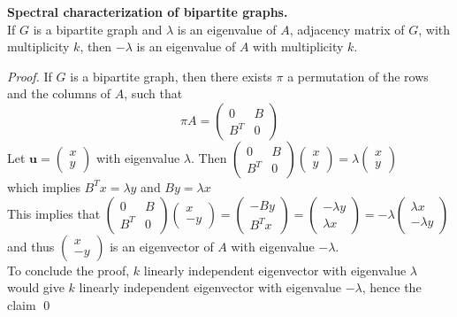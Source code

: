 \begin{proposition}{\textbf{Spectral characterization of bipartite graphs.}} \\
If $ G $ is a bipartite graph and $ \lambda $ is an eigenvalue of $ A $, adjacency matrix of $ G $, with multiplicity $ k $, then $ -\lambda $ is an eigenvalue of $ A $ with multiplicity $ k $.
\begin{proof}
If $ G $ is a bipartite graph, then there exists $ \pi $ a permutation of the rows and the columns of $ A $, such that
\[ \pi A = 
\begin{pmatrix}
0   & B \\
B^T & 0\
\end{pmatrix}
\]
Let $ \mathbf{u}= \begin{pmatrix}
x \\y
\end{pmatrix} $ with eigenvalue $ \lambda $. Then
$
\begin{pmatrix}
	0   & B \\
	B^T & 0\
\end{pmatrix}
\begin{pmatrix}
x \\
y
\end{pmatrix}
= \lambda
\begin{pmatrix}
x \\
y
\end{pmatrix}
$ \\
which implies $ B^T x=\lambda y $ and $ By=\lambda x $ \\
This implies that 
$
\begin{pmatrix}
0   & B \\
B^T & 0\
\end{pmatrix}
\begin{pmatrix}
x \\
-y
\end{pmatrix}
=
\begin{pmatrix}
-By \\
B^Tx
\end{pmatrix}
=
\begin{pmatrix}
-\lambda y \\
\lambda  x
\end{pmatrix}
=
-\lambda
\begin{pmatrix}
\lambda  x \\
-\lambda y
\end{pmatrix}
$ \\
and thus $
\begin{pmatrix}
x \\
-y
\end{pmatrix} $
is an eigenvector of $ A $ with eigenvalue $ - \lambda $. \\
To conclude the proof, $ k $ linearly independent eigenvector with eigenvalue $ \lambda $ would give $ k $ linearly independent eigenvector with eigenvalue $ - \lambda $, hence the claim
\qed
\end{proof}
\end{proposition}
